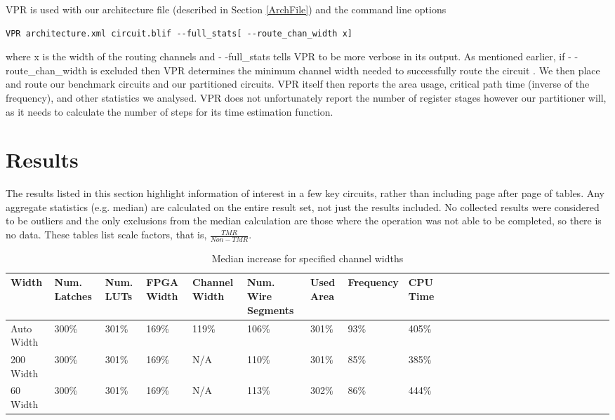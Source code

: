 \documentclass[12pt,final,oneside]{memoir} %
\begin{document}
\ac{VPR} is used with our architecture file (described in Section \ref{ArchFile}) and the command line options
\begin{lstlisting}
VPR architecture.xml circuit.blif --full_stats[ --route_chan_width x]
\end{lstlisting} where x is the width of the routing channels and - -full\_stats tells \ac{VPR} to be more verbose in its output.
As mentioned earlier, if - -route\_chan\_width is excluded then \ac{VPR} determines the minimum channel width needed to successfully route the circuit \cite{VPRManual}. We then place and route our benchmark circuits and our partitioned circuits. \ac{VPR} itself then reports the area usage, critical path time (inverse of the frequency), and other statistics we analysed. \ac{VPR} does not unfortunately report the number of register stages however our partitioner will, as it needs to calculate the number of steps for its time estimation function.

\section{Results}\label{BenchmarkResults}
The results listed in this section highlight information of interest in a few key circuits, rather than including page after page of tables. Any aggregate statistics (e.g. median) are calculated on the entire result set, not just the results included. No collected results were considered to be outliers and the only exclusions from the median calculation are those where the operation was not able to be completed, so there is no data.
These tables list scale factors, that is, $\frac{TMR}{Non-TMR}$.
\begin{table}
    \begin{adjustwidth}{-1cm}{-1.1cm}
        \begin{tabularx}{1.1\textwidth}{XXXXXXXXXXXXXXXXXXXXXXXXXX}
           \toprule
            Width & Num. Latches & Num. \acp{LUT} & FPGA Width & Channel Width & Num. Wire Segments & Used Area & Frequency & CPU Time\\
          \midrule
            Auto Width         & 300\% & 301\% & 169\% & 119\% & 106\% & 301\% & 93\% & 405\%\\
            200 Width          & 300\% & 301\% & 169\% & N/A   & 110\% & 301\% & 85\% & 385\%\\
            60 Width           & 300\% & 301\% & 169\% & N/A   & 113\% & 302\% & 86\% & 444\%\\
          \bottomrule
        \end{tabularx}
        \caption{Median increase for specified channel widths}
        \label{medianRes}
    \end{adjustwidth}
\end{table}
\end{document}
